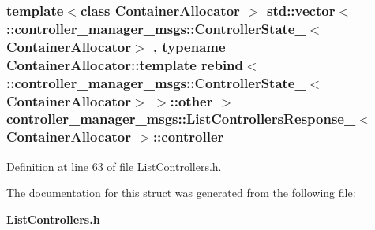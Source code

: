 \subsubsection[{controller}]{\setlength{\rightskip}{0pt plus 5cm}template$<$class Container\-Allocator $>$ std\-::vector$<$ \-::{\bf controller\-\_\-manager\-\_\-msgs\-::\-Controller\-State\-\_\-}$<$\-Container\-Allocator$>$ , typename \-Container\-Allocator\-::template rebind$<$ \-::{\bf controller\-\_\-manager\-\_\-msgs\-::\-Controller\-State\-\_\-}$<$\-Container\-Allocator$>$ $>$\-::other $>$ {\bf controller\-\_\-manager\-\_\-msgs\-::\-List\-Controllers\-Response\-\_\-}$<$ \-Container\-Allocator $>$\-::{\bf controller}}\label{structcontroller__manager__msgs_1_1ListControllersResponse___aba450f44a0d7331cb2fa84cbf334ba1e}


\-Definition at line 63 of file \-List\-Controllers.\-h.



\-The documentation for this struct was generated from the following file\-:\begin{DoxyCompactItemize}
\item 
{\bf \-List\-Controllers.\-h}\end{DoxyCompactItemize}
